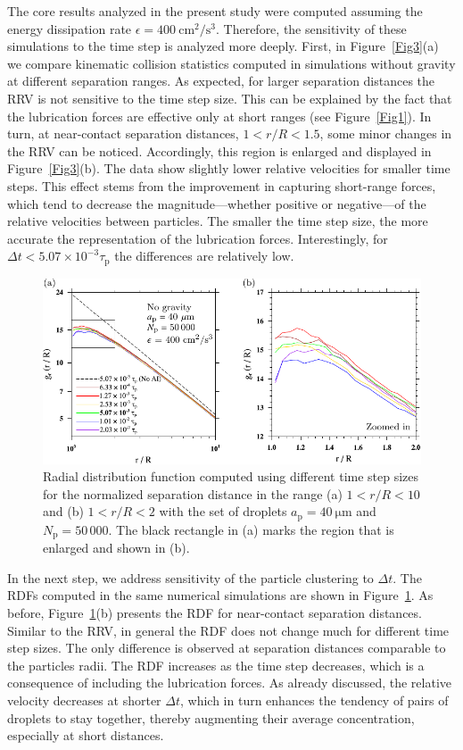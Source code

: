 \documentclass[../thesis.tex]{subfiles}
\begin{document}
The core results analyzed in the present study were computed assuming the energy dissipation rate $\epsilon = 400~\mathrm{cm^2/s^3}$. Therefore, the sensitivity of these simulations to the time step is analyzed more deeply. First, in Figure~\ref{Fig3}(a) we compare kinematic collision statistics computed in simulations without gravity at different separation ranges. As expected, for larger separation distances the RRV is not sensitive to the time step size. This can be explained by the fact that the lubrication forces are effective only at short ranges (see Figure~\ref{Fig1}). In turn, at near-contact separation distances, $1<r/R<1.5$, some minor changes in the RRV can be noticed. Accordingly, this region is enlarged and displayed in Figure~\ref{Fig3}(b). The data show slightly lower relative velocities for smaller time steps. This effect stems from the improvement in capturing short-range forces, which tend to decrease the magnitude---whether positive or negative---of the relative velocities between particles. The smaller the time step size, the more accurate the representation of the lubrication forces. Interestingly, for $\Delta t < 5.07 \times 10^{-3} \tau_\text{p}$ the differences are relatively low.

\begin{figure}%
\center
\includegraphics[width=\textwidth]{../figs/JFM/fig4.pdf}
\caption{Radial distribution function computed using different time step sizes
for the normalized separation distance in the range (a) $1 < r/R < 10$ and (b) $1 < r/R < 2$
 with the set of droplets $a_\mathrm{p} = 40~\mathrm{\mu m}$ and $N_\mathrm{p} = 50\,000$.
The black rectangle in (a) marks the region that is enlarged and shown in (b).}
\label{Fig4}
\end{figure}%

In the next step, we address sensitivity of the particle clustering to $\Delta t$. The RDFs computed in the same numerical simulations are shown in Figure~\ref{Fig4}. As before, Figure~\ref{Fig4}(b) presents the RDF for near-contact separation distances. Similar to the RRV, in general the RDF does not change much for different time step sizes. The only difference is observed at separation distances comparable to the particles radii. The RDF increases as the time step decreases, which is a consequence of including the lubrication forces. As already discussed, the relative velocity decreases at shorter $\Delta t$, which in turn enhances the tendency of pairs of droplets to stay together, thereby augmenting their average concentration, especially at short distances.
\end{document}

